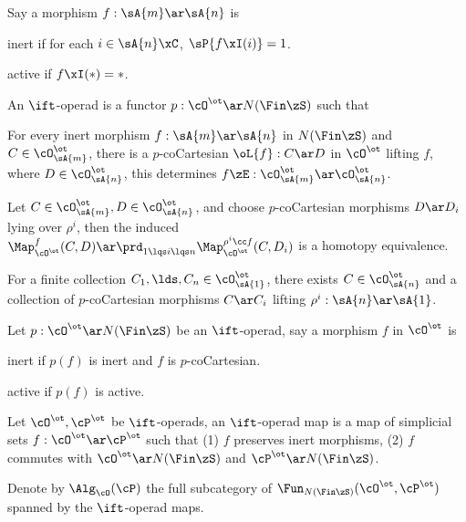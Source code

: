 \documentclass[article, a4paper, twoside]{universal}
\begin{document}
\begin{dfn}[2.1.1.8, 2.1.2.1]
    Say a morphism $f:\sA{m}\ar\sA{n}$ is
    \begin{enr}[label=(\arabic*)]
        \item inert if for each $i\in\sA{n}\xC$, $\sP{f\xI(i)}=1$.
        \item active if $f\xI(*)=*$.
    \end{enr}
\end{dfn}

\begin{dfn}[2.1.1.10]
    An $\ift$-operad is a functor $p:\cO^{\ot}\ar N(\Fin\zS)$ such that
    \begin{enr}[label=(\arabic*)]
        \item For every inert morphism $f:\sA{m}\ar\sA{n}$ in $N(\Fin\zS)$ and $C\in\cO^{\ot}_{\sA{m}}$, there is a $p$-coCartesian $\oL{f}:C\ar D$ in $\cO^{\ot}$ lifting $f$, where $D\in\cO^{\ot}_{\sA{n}}$, this determines $f\zE:\cO_{\sA{m}}^{\ot}\ar\cO_{\sA{n}}^{\ot}$.
        \item Let $C\in\cO_{\sA{m}}^{\ot},D\in\cO_{\sA{n}}^{\ot}$, and choose $p$-coCartesian morphisms $D\ar D_{i}$ lying over $\rho^{i}$, then the induced $\Map_{\cO^{\ot}}^{f}(C,D)\ar\prd_{1\lqs i\lqs n}\Map_{\cO^{\ot}}^{\rho^{i}\cc f}(C,D_{i})$ is a homotopy equivalence.
        \item For a finite collection $C_{1},\lds,C_{n}\in\cO_{\sA{1}}^{\ot}$, there exists $C\in\cO_{\sA{n}}^{\ot}$ and a collection of $p$-coCartesian morphisms $C\ar C_{i}$ lifting $\rho^{i}:\sA{n}\ar\sA{1}$.
    \end{enr}
\end{dfn}

\begin{dfn}[2.1.2.3]
    Let $p:\cO^{\ot}\ar N(\Fin\zS)$ be an $\ift$-operad, say a morphism $f$ in $\cO^{\ot}$ is
    \begin{enr}[label=(\arabic*)]
        \item inert if $p(f)$ is inert and $f$ is $p$-coCartesian.
        \item active if $p(f)$ is active.
    \end{enr}
\end{dfn}

\begin{dfn}[2.1.2.7]
    Let $\cO^{\ot},\cP^{\ot}$ be $\ift$-operads, an $\ift$-operad map is a map of simplicial sets $f:\cO^{\ot}\ar\cP^{\ot}$ such that (1) $f$ preserves inert morphisms, (2) $f$ commutes with $\cO^{\ot}\ar N(\Fin\zS)$ and $\cP^{\ot}\ar N(\Fin\zS)$.

    Denote by $\Alg_{\cO}(\cP)$ the full subcategory of $\Fun_{N(\Fin\zS)}(\cO^{\ot},\cP^{\ot})$ spanned by the $\ift$-operad maps.
\end{dfn}
\end{document}
